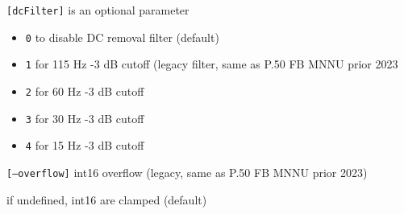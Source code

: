 {\tt [dcFilter]} is an optional parameter
\begin{itemize}
    \item {\tt 0} to disable DC removal filter (default)
    \item {\tt 1} for 115 Hz -3 dB cutoff (legacy filter, same as P.50 FB MNNU prior 2023
    \item {\tt 2} for 60 Hz -3 dB cutoff
    \item {\tt 3} for 30 Hz -3 dB cutoff
    \item {\tt 4} for 15 Hz -3 dB cutoff
\end{itemize}

{\tt [--overflow]} int16 overflow (legacy, same as P.50 FB MNNU prior 2023)

                if undefined, int16 are clamped (default)
